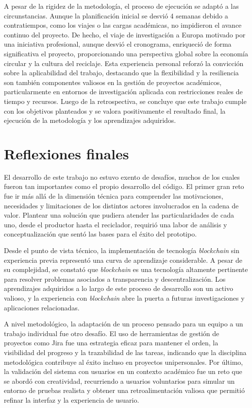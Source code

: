 A pesar de la rigidez de la metodología, el proceso de ejecución se adaptó a las circunstancias. Aunque la planificación inicial se desvió 4 semanas debido a contratiempos, como los viajes o las cargas académicas, no impidieron el avance continuo del proyecto. De hecho, el viaje de investigación a Europa motivado por una iniciativa profesional, aunque desvió el cronograma, enriqueció de forma significativa el proyecto, proporcionando una perspectiva global sobre la economía circular y la cultura del reciclaje. Esta experiencia personal reforzó la convicción sobre la aplicabilidad del trabajo, destacando que la flexibilidad y la resiliencia son también componentes valiosos en la gestión de proyectos académicos, particularmente en entornos de investigación aplicada con restricciones reales de tiempo y recursos. Luego de la retrospectiva, se concluye que este trabajo cumple con los objetivos planteados y se valora positivamente el resultado final, la ejecución de la metodología y los aprendizajes adquiridos.

\section{Reflexiones finales}

El desarrollo de este trabajo no estuvo exento de desafíos, muchos de los cuales fueron tan importantes como el propio desarrollo del código. El primer gran reto fue ir más allá de la dimensión técnica para comprender las motivaciones, necesidades y limitaciones de los distintos actores involucrados en la cadena de valor. Plantear una solución que pudiera atender las particularidades de cada uno, desde el productor hasta el reciclador, requirió una labor de análisis y conceptualización que sentó las bases para el éxito del prototipo.

Desde el punto de vista técnico, la implementación de tecnología \textit{blockchain} sin experiencia previa representó una curva de aprendizaje considerable. A pesar de su complejidad, se constató que \textit{blockchain} es una tecnología altamente pertinente para resolver problemas asociados a transparencia y descentralización. Los aprendizajes adquiridos a lo largo de este proceso de desarrollo son un activo valioso, y la experiencia con \textit{blockchain} abre la puerta a futuras investigaciones y aplicaciones relacionadas.

A nivel metodológico, la adaptación de un proceso pensado para un equipo a un trabajo individual fue otro desafío. El uso de herramientas de gestión de proyectos como Jira fue una estrategia eficaz para mantener el orden, la visibilidad del progreso y la trazabilidad de las tareas, indicando que la disciplina metodológica contribuye al éxito incluso en proyectos unipersonales. Por último, la validación del sistema con usuarios en un contexto académico fue un reto que se abordó con creatividad, recurriendo a usuarios voluntarios para simular un entorno de pruebas realista y obtener una retroalimentación valiosa que permitió refinar la interfaz y la experiencia de usuario.

